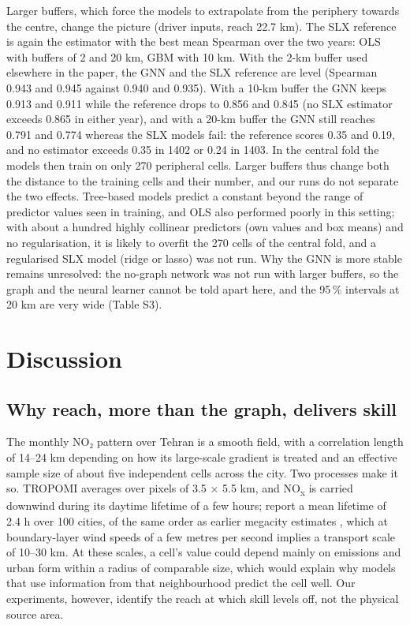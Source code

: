\documentclass[pdflatex,sn-basic]{sn-jnl}
\begin{document}
Larger buffers, which force the models to extrapolate from the periphery towards the centre, change the picture (driver inputs, reach 22.7 km). The SLX reference is again the estimator with the best mean Spearman over the two years: OLS with buffers of 2 and 20 km, GBM with 10 km. With the 2-km buffer used elsewhere in the paper, the GNN and the SLX reference are level (Spearman 0.943 and 0.945 against 0.940 and 0.935). With a 10-km buffer the GNN keeps 0.913 and 0.911 while the reference drops to 0.856 and 0.845 (no SLX estimator exceeds 0.865 in either year), and with a 20-km buffer the GNN still reaches 0.791 and 0.774 whereas the SLX models fail: the reference scores 0.35 and 0.19, and no estimator exceeds 0.35 in 1402 or 0.24 in 1403. In the central fold the models then train on only 270 peripheral cells. Larger buffers thus change both the distance to the training cells and their number, and our runs do not separate the two effects. Tree-based models predict a constant beyond the range of predictor values seen in training, and OLS also performed poorly in this setting; with about a hundred highly collinear predictors (own values and box means) and no regularisation, it is likely to overfit the 270 cells of the central fold, and a regularised SLX model (ridge or lasso) was not run. Why the GNN is more stable remains unresolved: the no-graph network was not run with larger buffers, so the graph and the neural learner cannot be told apart here, and the 95\,\% intervals at 20 km are very wide (Table S3).

\section{Discussion}\label{sec:discussion}

\subsection{Why reach, more than the graph, delivers skill}\label{sec:why}

The monthly NO₂ pattern over Tehran is a smooth field, with a correlation length of 14--24 km depending on how its large-scale gradient is treated and an effective sample size of about five independent cells across the city. Two processes make it so. TROPOMI averages over pixels of 3.5 × 5.5 km, and NO\textsubscript{x} is carried downwind during its daytime lifetime of a few hours; \citet{beirle2024} report a mean lifetime of 2.4 h over 100 cities, of the same order as earlier megacity estimates \citep{beirle2011}, which at boundary-layer wind speeds of a few metres per second implies a transport scale of 10--30 km. At these scales, a cell's value could depend mainly on emissions and urban form within a radius of comparable size, which would explain why models that use information from that neighbourhood predict the cell well. Our experiments, however, identify the reach at which skill levels off, not the physical source area.
\end{document}

